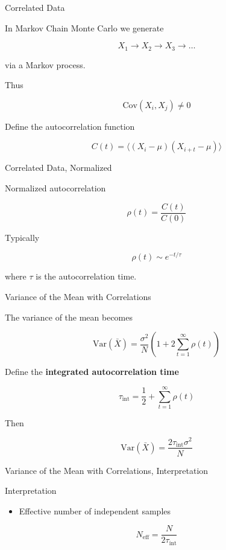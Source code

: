 \documentclass{beamer}
\begin{document}
\begin{frame}{Correlated Data}

  In Markov Chain Monte Carlo we generate

  \[
  X_1 \rightarrow X_2 \rightarrow X_3 \rightarrow \dots
  \]

  via a Markov process.

  Thus

  \[
  \text{Cov}(X_i,X_j) \neq 0
  \]

  Define the autocorrelation function

  \[
  C(t)
  =
  \langle (X_i-\mu)(X_{i+t}-\mu) \rangle
  \]

\end{frame}


\begin{frame}{Correlated Data, Normalized}

  Normalized autocorrelation

  \[
  \rho(t) = \frac{C(t)}{C(0)}
  \]

  Typically

  \[
  \rho(t) \sim e^{-t/\tau}
  \]

  where $\tau$ is the autocorrelation time.
\end{frame}


\begin{frame}{Variance of the Mean with Correlations}

  The variance of the mean becomes

  \[
  \mathrm{Var}(\bar X)
  =
  \frac{\sigma^2}{N}
  \left(
  1
  +
  2\sum_{t=1}^{\infty}\rho(t)
  \right)
  \]

  Define the \textbf{integrated autocorrelation time}

  \[
  \tau_{\mathrm{int}}
  =
  \frac{1}{2}
  +
  \sum_{t=1}^{\infty}\rho(t)
  \]

  Then

  \[
  \mathrm{Var}(\bar X)
  =
  \frac{2\tau_{\mathrm{int}}\sigma^2}{N}
  \]

\end{frame}


\begin{frame}{Variance of the Mean with Correlations, Interpretation}

Interpretation

  \begin{itemize}
  \item Effective number of independent samples
  \end{itemize}

  \[
  N_{\mathrm{eff}}
  =
  \frac{N}{2\tau_{\mathrm{int}}}
  \]
\end{frame}
\end{document}
